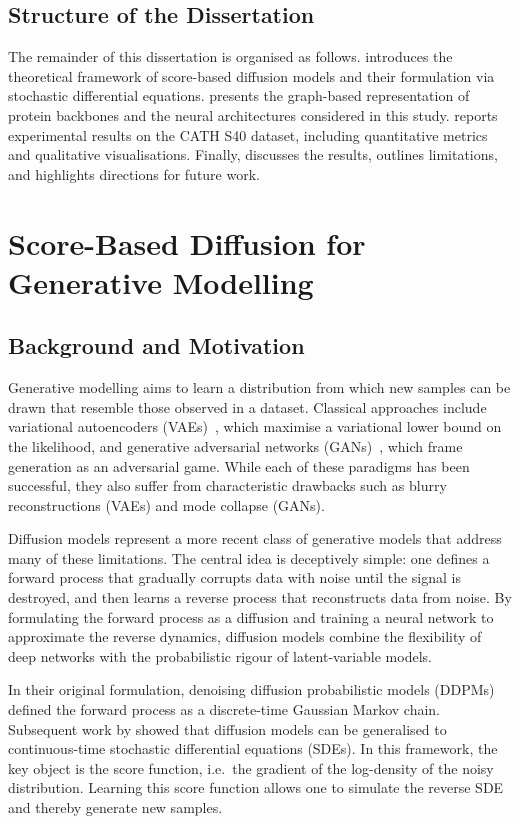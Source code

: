 \documentclass[a4paper,12pt]{article}
\begin{document}
\subsection{Structure of the Dissertation}
The remainder of this dissertation is organised as follows.  introduces the theoretical framework of score-based diffusion models and their formulation via stochastic differential equations.  presents the graph-based representation of protein backbones and the neural architectures considered in this study.  reports experimental results on the CATH S40 dataset, including quantitative metrics and qualitative visualisations. Finally,  discusses the results, outlines limitations, and highlights directions for future work.

\clearpage

\section{Score-Based Diffusion for Generative Modelling}\label{sec:SBD}
\subsection{Background and Motivation}
Generative modelling aims to learn a distribution from which new samples can be drawn that resemble those observed in a dataset. Classical approaches include variational autoencoders (VAEs)~\citep{kingma2022AutoEncodingVariationalBayes}, which maximise a variational lower bound on the likelihood, and generative adversarial networks (GANs)~\citep{goodfellow2020GenerativeAdversarialNetworks}, which frame generation as an adversarial game. While each of these paradigms has been successful, they also suffer from characteristic drawbacks such as blurry reconstructions (VAEs) and mode collapse (GANs).

Diffusion models represent a more recent class of generative models that address many of these limitations. The central idea is deceptively simple: one defines a forward process that gradually corrupts data with noise until the signal is destroyed, and then learns a reverse process that reconstructs data from noise. By formulating the forward process as a diffusion and training a neural network to approximate the reverse dynamics, diffusion models combine the flexibility of deep networks with the probabilistic rigour of latent-variable models. 

In their original formulation, denoising diffusion probabilistic models (DDPMs)~\citep{hoDenoisingDiffusionProbabilistic2020} defined the forward process as a discrete-time Gaussian Markov chain. Subsequent work by \citet{song2021ScoreBasedGenerativeModeling} showed that diffusion models can be generalised to continuous-time stochastic differential equations (SDEs). In this framework, the key object is the score function, i.e.~the gradient of the log-density of the noisy distribution. Learning this score function allows one to simulate the reverse SDE and thereby generate new samples.
\end{document}
